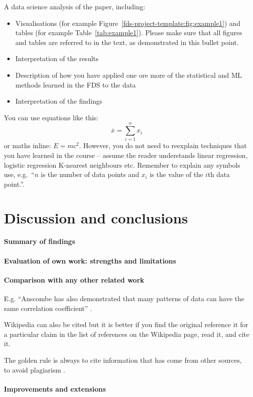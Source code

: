 \documentclass[11pt,a4paper]{article}
\begin{document}
A data science analysis of the paper, including: 
\begin{itemize}
\item Visualisations (for example
  Figure~\ref{fds-project-template:fig:example1}) and tables (for
  example Table~\ref{tab:example1}). Please make sure that all figures
  and tables are referred to in the text, as demonstrated in this
  bullet point.
\item Interpretation of the results 
\item Description of how you have applied one ore more of the
  statistical and ML methods learned in the FDS to the data
\item Interpretation of the findings 
\end{itemize}

You can use equations like this:
\begin{equation}
  \label{fds-project-template:eq:1}
  \overline{x} = \sum_{i=1}^n x_i
\end{equation}
or maths inline: $E=mc^2$. However, you do not need to reexplain techniques that you have learned in the course -- assume the reader understands linear regression, logistic regression K-nearest neighbours etc.  Remember to explain any symbols use, e.g.~``$n$ is the number of data points and $x_i$ is the value of the $i$th data point.''.

\section{Discussion and conclusions}

\paragraph{Summary of findings}

\paragraph{Evaluation of own work: strengths and limitations}

\paragraph{Comparison with any other related work}
E.g. ``Anscombe has also demonstrated that many patterns of data can
have the same correlation coefficient'' \cite{Ansc73Grap}.

Wikipedia can also be cited but it is better if you find the original
reference it for a particular claim in the list of references on the
Wikipedia page, read it, and cite it.

The golden rule is always to cite information that has come from other
sources, to avoid plagiarism \cite{wiki:plagarism}.

\paragraph{Improvements and extensions}



\end{document}

